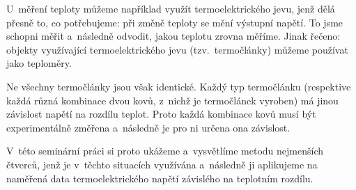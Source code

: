 U~měření teploty můžeme například využít termoelektrického jevu, jenž dělá
přesně to, co potřebujeme: při změně teploty se mění výstupní napětí. To jsme
schopni měřit a~následně odvodit, jakou teplotu zrovna měříme. Jinak řečeno:
objekty využívající termoelektrického jevu (tzv.~termočlánky) můžeme používat
jako teploměry.

Ne všechny termočlánky jsou však identické. Každý typ termočlánku (respektive
každá různá kombinace dvou kovů, z~nichž je termočlánek vyroben) má jinou
závislost napětí na rozdílu teplot. Proto každá kombinace kovů musí být
experimentálně změřena a~následně je pro ni určena ona závislost.

V~této seminární práci si proto ukážeme a~vysvětlíme metodu nejmenších čtverců,
jenž je v~těchto situacích využívána a~následně ji aplikujeme na naměřená data
termoelektrického napětí závislého na teplotním rozdílu.
